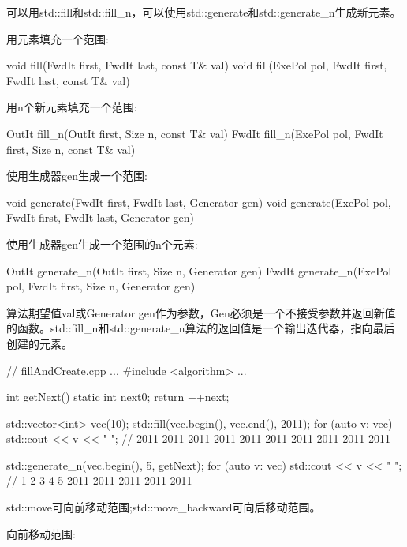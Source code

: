 
可以用std::fill和std::fill\_n，可以使用std::generate和std::generate\_n生成新元素。

用元素填充一个范围:

\begin{cpp}
void fill(FwdIt first, FwdIt last, const T& val)
void fill(ExePol pol, FwdIt first, FwdIt last, const T& val)
\end{cpp}

用n个新元素填充一个范围:

\begin{cpp}
OutIt fill_n(OutIt first, Size n, const T& val)
FwdIt fill_n(ExePol pol, FwdIt first, Size n, const T& val)
\end{cpp}

使用生成器gen生成一个范围:

\begin{cpp}
void generate(FwdIt first, FwdIt last, Generator gen)
void generate(ExePol pol, FwdIt first, FwdIt last, Generator gen)
\end{cpp}

使用生成器gen生成一个范围的n个元素:

\begin{cpp}
OutIt generate_n(OutIt first, Size n, Generator gen)
FwdIt generate_n(ExePol pol, FwdIt first, Size n, Generator gen)
\end{cpp}

算法期望值val或Generator gen作为参数，Gen必须是一个不接受参数并返回新值的函数。std::fill\_n和std::generate\_n算法的返回值是一个输出迭代器，指向最后创建的元素。


\begin{cpp}
// fillAndCreate.cpp
...
#include <algorithm>
...

int getNext(){
	static int next{0};
	return ++next;
}

std::vector<int> vec(10);
std::fill(vec.begin(), vec.end(), 2011);
for (auto v: vec) std::cout << v << " ";
						// 2011 2011 2011 2011 2011 2011 2011 2011 2011 2011

std::generate_n(vec.begin(), 5, getNext);
for (auto v: vec) std::cout << v << " ";
						// 1 2 3 4 5 2011 2011 2011 2011 2011
\end{cpp}


std::move可向前移动范围;std::move\_backward可向后移动范围。

向前移动范围:

